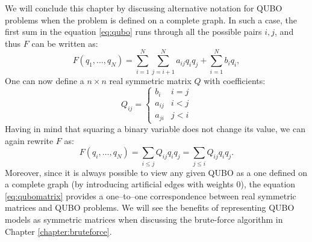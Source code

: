 We will conclude this chapter by discussing alternative notation for QUBO
problems when the problem is defined on a complete graph. In such a case, the
first sum in the equation \eqref{eq:qubo} runs through all the possible pairs
${i, j}$, and thus $F$ can be written as:
\begin{equation}
  \label{eq:qubocomplete}
  F(q_1, \ldots, q_N) =  \sum_{i=1}^N \sum_{j=i+1}^N a_{ij} q_i q_j + \sum_{i=1}^N b_iq_i,
\end{equation}
One can now define a $n \times n$ real symmetric matrix $Q$ with coefficients:
\begin{equation}
  Q_{ij} = \begin{cases}
    b_{i}  & i = j \\
    a_{ij} & i < j \\
    a_{ji} & j < i
  \end{cases}
\end{equation}
Having in mind that squaring a binary variable does not change its value, we
can again rewrite $F$ as:
\begin{equation}
  \label{eq:qubomatrix}
  F(q_{i}, \ldots, q_{N}) = \sum_{i \le j} Q_{ij} q_{i}q_{j} = \sum_{j \le i} Q_{ij} q_{i}q_{j}.
\end{equation}
Moreover, since it is always possible to view any given QUBO as a one defined
on a complete graph (by introducing artificial edges with weights 0), the
equation \eqref{eq:qubomatrix} provides a one--to--one correspondence between
real symmetric matrices and QUBO problems. We will see the benefits of
representing QUBO models as symmetric matrices when discussing the brute-force
algorithm in Chapter \ref{chapter:bruteforce}.

